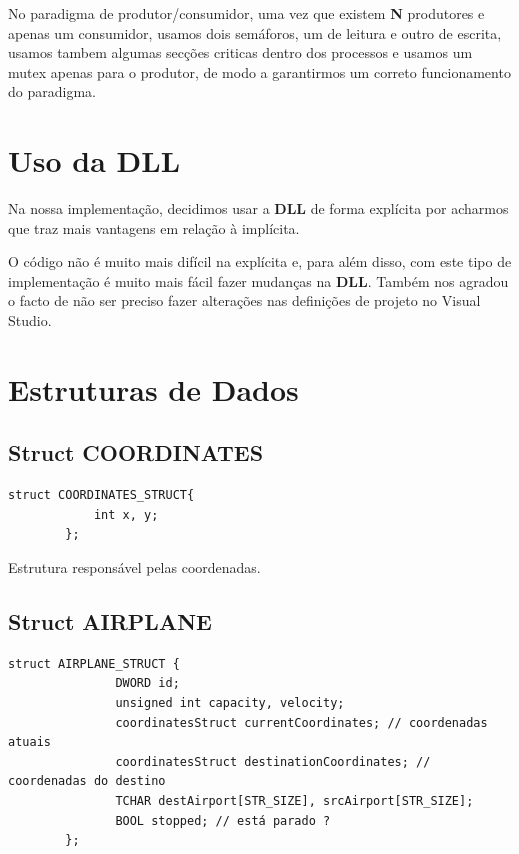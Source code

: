 \documentclass[11pt]{article}
\begin{document}
	No paradigma de produtor/consumidor, uma vez que existem \textbf{N} produtores e apenas um consumidor, usamos dois semáforos, um de leitura e outro de escrita, usamos tambem algumas secções criticas dentro dos processos e usamos um mutex apenas para o produtor, de modo a garantirmos um correto funcionamento do paradigma.
	
	
	\large
	\section{Uso da DLL}
	\normalsize
	
	Na nossa implementação, decidimos usar a \textbf{DLL} de forma explícita por acharmos que traz mais vantagens em relação à implícita.
	
	O código não é muito mais difícil na explícita e, para além disso, com este tipo de implementação é muito mais fácil fazer mudanças na \textbf{DLL}. Também nos agradou o facto de não ser preciso fazer alterações nas definições de projeto no Visual Studio.
	
	\large
	\section{Estruturas de Dados}
	\subsection{Struct COORDINATES}
	\normalsize
	
	\begin{lstlisting}[caption=Struct COORDINATES]
	    struct COORDINATES_STRUCT{
	        int x, y;
	    };
	\end{lstlisting}
	
	Estrutura responsável pelas coordenadas.
	
	
    \large
	\subsection{Struct AIRPLANE}
	\normalsize

	\begin{lstlisting}[caption=Struct AIRPLANE]
		struct AIRPLANE_STRUCT {
			   DWORD id;
	           unsigned int capacity, velocity;
	           coordinatesStruct currentCoordinates; // coordenadas atuais
	           coordinatesStruct destinationCoordinates; // coordenadas do destino
	           TCHAR destAirport[STR_SIZE], srcAirport[STR_SIZE];
	           BOOL stopped; // está parado ?
		};
	\end{lstlisting}
\end{document}
